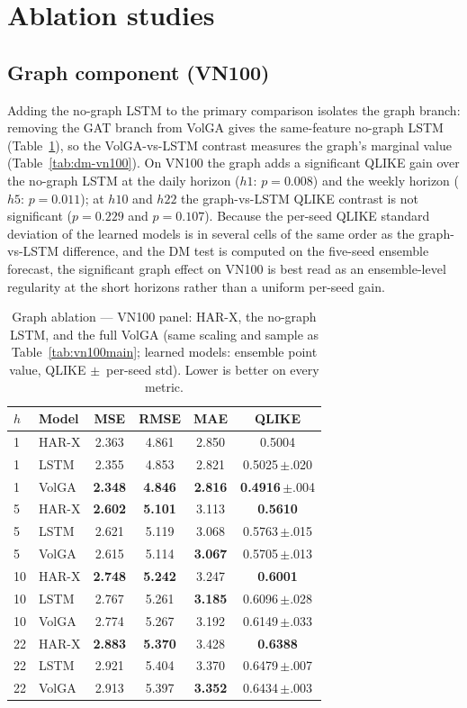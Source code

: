 \documentclass[runningheads]{llncs}
\begin{document}
\FloatBarrier
\section{Ablation studies}\label{sec:abl}
\subsection{Graph component (VN100)}\label{sec:graph}
Adding the no-graph LSTM to the primary comparison isolates the graph branch: removing the GAT branch
from VolGA gives the same-feature no-graph LSTM (Table~\ref{tab:vn100graph}), so the VolGA-vs-LSTM
contrast measures the graph's marginal value (Table~\ref{tab:dm-vn100}). On VN100 the graph adds a
significant QLIKE gain over the no-graph LSTM at the daily horizon ($h1$: $p=0.008$) and the weekly
horizon ($h5$: $p=0.011$); at $h10$ and $h22$ the graph-vs-LSTM QLIKE contrast is not significant
($p=0.229$ and $p=0.107$). Because the per-seed QLIKE standard deviation of the learned models is in
several cells of the same order as the graph-vs-LSTM difference, and the DM test is computed on the
five-seed ensemble forecast, the significant graph effect on VN100 is best read as an ensemble-level
regularity at the short horizons rather than a uniform per-seed gain.

\begin{table}[t]
\centering
\caption{Graph ablation --- VN100 panel: HAR-X, the no-graph LSTM, and the full VolGA (same scaling
and sample as Table~\ref{tab:vn100main}; learned models: ensemble point value, QLIKE $\pm$~per-seed
std). Lower is better on every metric.}
\label{tab:vn100graph}
\footnotesize
\setlength{\tabcolsep}{6pt}
\begin{tabular}{llcccc}
\toprule
$h$ & Model & MSE & RMSE & MAE & QLIKE \\
\midrule
1 & HAR-X & 2.363 & 4.861 & 2.850 & 0.5004 \\
1 & LSTM  & 2.355 & 4.853 & 2.821 & 0.5025\,$\pm$.020 \\
1 & VolGA & \textbf{2.348} & \textbf{4.846} & \textbf{2.816} & \textbf{0.4916}\,$\pm$.004 \\
\midrule
5 & HAR-X & \textbf{2.602} & \textbf{5.101} & 3.113 & \textbf{0.5610} \\
5 & LSTM  & 2.621 & 5.119 & 3.068 & 0.5763\,$\pm$.015 \\
5 & VolGA & 2.615 & 5.114 & \textbf{3.067} & 0.5705\,$\pm$.013 \\
\midrule
10 & HAR-X & \textbf{2.748} & \textbf{5.242} & 3.247 & \textbf{0.6001} \\
10 & LSTM  & 2.767 & 5.261 & \textbf{3.185} & 0.6096\,$\pm$.028 \\
10 & VolGA & 2.774 & 5.267 & 3.192 & 0.6149\,$\pm$.033 \\
\midrule
22 & HAR-X & \textbf{2.883} & \textbf{5.370} & 3.428 & \textbf{0.6388} \\
22 & LSTM  & 2.921 & 5.404 & 3.370 & 0.6479\,$\pm$.007 \\
22 & VolGA & 2.913 & 5.397 & \textbf{3.352} & 0.6434\,$\pm$.003 \\
\bottomrule
\end{tabular}
\end{table}
\end{document}

